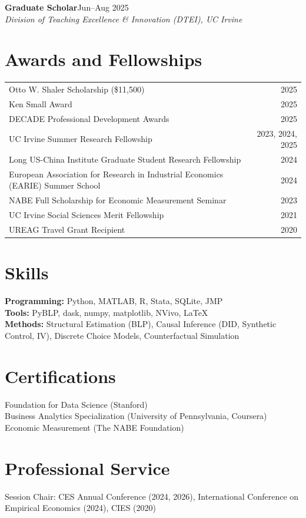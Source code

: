 \documentclass[11pt,letterpaper]{article}
\newcommand{\entry}[4]{
  \textbf{#1}\hfill #2\\
  \textit{#3}\hfill\textit{#4}\\[2pt]
}
\begin{document}
\entry{Graduate Scholar}{Jun--Aug 2025}{Division of Teaching Excellence \& Innovation (DTEI), UC Irvine}{}

\section{Awards and Fellowships}
\begin{tabular}{p{} r}
Otto W. Shaler Scholarship (\$11,500) & 2025\\
Ken Small Award & 2025\\
DECADE Professional Development Awards & 2025\\
UC Irvine Summer Research Fellowship & 2023, 2024, 2025\\
Long US-China Institute Graduate Student Research Fellowship & 2024\\
European Association for Research in Industrial Economics (EARIE) Summer School & 2024\\
NABE Full Scholarship for Economic Measurement Seminar & 2023\\
UC Irvine Social Sciences Merit Fellowship & 2021\\
UREAG Travel Grant Recipient & 2020\\
\end{tabular}

\section{Skills}
\textbf{Programming:} Python, MATLAB, R, Stata, SQLite, JMP\\
\textbf{Tools:} PyBLP, dask, numpy, matplotlib, NVivo, \LaTeX\\
\textbf{Methods:} Structural Estimation (BLP), Causal Inference (DID, Synthetic Control, IV), Discrete Choice Models, Counterfactual Simulation

\section{Certifications}
Foundation for Data Science (Stanford)\\
Business Analytics Specialization (University of Pennsylvania, Coursera)\\
Economic Measurement (The NABE Foundation)

\section{Professional Service}
Session Chair: CES Annual Conference (2024, 2026), International Conference on Empirical Economics (2024), CIES (2020)
\end{document}
